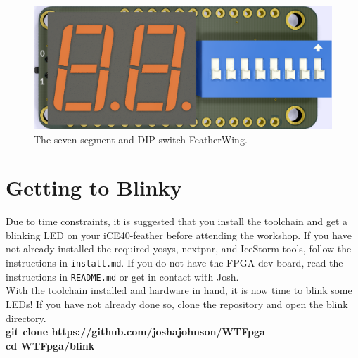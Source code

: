\documentclass[12pt,a4paper]{article}
\begin{document}
\begin{figure}[H]
\begin{centering}
	\includegraphics[width=\linewidth]{7segment_render.PNG}
	\caption{The seven segment and DIP switch FeatherWing.}
\end{centering}
\end{figure}
\newpage
\section{Getting to Blinky}
Due to time constraints, it is suggested that you install the toolchain and get a blinking LED on your iCE40-feather before attending the workshop. If you have not already installed the required yosys, nextpnr, and IceStorm tools, follow the instructions in \texttt{install.md}. If you do not have the FPGA dev board, read the instructions in \texttt{README.md} or get in contact with Josh. \\

\noindent
With the toolchain installed and hardware in hand, it is now time to blink some LEDs! If you have not already done so, clone the repository and open the blink directory.\\

\noindent
\textbf{git clone https://github.com/joshajohnson/WTFpga} \\
\textbf{cd WTFpga/blink}\\
\end{document}
